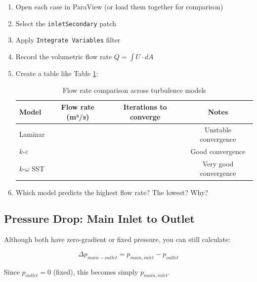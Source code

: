 \documentclass[
parskip=half,      %
DIV=12,            %
headings=normal,   %
fontsize=11pt,     %
english            %
]{scrartcl}
\begin{document}
	\begin{enumerate}
		\item Open each case in ParaView (or load them together for comparison)
		\item Select the \texttt{inletSecondary} patch
		\item Apply \texttt{Integrate Variables} filter
		\item Record the volumetric flow rate $Q = \int U \cdot dA$
		\item Create a table like Table \ref{tab:flowrates}:
		
		\begin{table}[h]
			\centering
			\begin{tabular}{|l|c|c|c|}
				\hline
				\textbf{Model} & \textbf{Flow rate (m³/s)} & \textbf{Iterations to converge} & \textbf{Notes} \\
				\hline
				Laminar & & & Unstable convergence \\
				$k$-$\varepsilon$ & & & Good convergence \\
				$k$-$\omega$ SST  & & & Very good convergence \\
				\hline
			\end{tabular}
			\caption{Flow rate comparison across turbulence models}
			\label{tab:flowrates}
		\end{table}
		
		\item Which model predicts the highest flow rate? The lowest? Why?
	\end{enumerate}
	
	\subsection{Pressure Drop: Main Inlet to Outlet}
	
	Although both have zero-gradient or fixed pressure, you can still calculate:
	
	\begin{equation*}
		\Delta p_{main-outlet} = p_{main,inlet} - p_{outlet}
	\end{equation*}
	
	Since $p_{outlet}=0$ (fixed), this becomes simply $p_{main,inlet}$.
	
\end{document}
